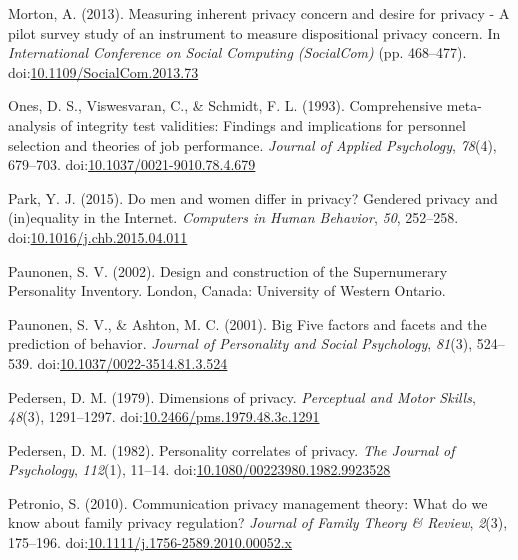 \documentclass[man,floatsintext]{apa6}
\theoremstyle{definition}
\theoremstyle{definition}
\theoremstyle{definition}
\theoremstyle{remark}
\begin{document}
\leavevmode\hypertarget{ref-Morton.2013}{}%
Morton, A. (2013). Measuring inherent privacy concern and desire for
privacy - A pilot survey study of an instrument to measure dispositional
privacy concern. In \emph{International Conference on Social Computing
(SocialCom)} (pp. 468--477).
doi:\href{https://doi.org/10.1109/SocialCom.2013.73}{10.1109/SocialCom.2013.73}

\leavevmode\hypertarget{ref-Ones.1993}{}%
Ones, D. S., Viswesvaran, C., \& Schmidt, F. L. (1993). Comprehensive
meta-analysis of integrity test validities: Findings and implications
for personnel selection and theories of job performance. \emph{Journal
of Applied Psychology}, \emph{78}(4), 679--703.
doi:\href{https://doi.org/10.1037/0021-9010.78.4.679}{10.1037/0021-9010.78.4.679}

\leavevmode\hypertarget{ref-Park.2015}{}%
Park, Y. J. (2015). Do men and women differ in privacy? Gendered privacy
and (in)equality in the Internet. \emph{Computers in Human Behavior},
\emph{50}, 252--258.
doi:\href{https://doi.org/10.1016/j.chb.2015.04.011}{10.1016/j.chb.2015.04.011}

\leavevmode\hypertarget{ref-Paunonen.2002}{}%
Paunonen, S. V. (2002). Design and construction of the Supernumerary
Personality Inventory. London, Canada: University of Western Ontario.

\leavevmode\hypertarget{ref-Paunonen.2001}{}%
Paunonen, S. V., \& Ashton, M. C. (2001). Big Five factors and facets
and the prediction of behavior. \emph{Journal of Personality and Social
Psychology}, \emph{81}(3), 524--539.
doi:\href{https://doi.org/10.1037/0022-3514.81.3.524}{10.1037/0022-3514.81.3.524}

\leavevmode\hypertarget{ref-Pedersen.1979}{}%
Pedersen, D. M. (1979). Dimensions of privacy. \emph{Perceptual and
Motor Skills}, \emph{48}(3), 1291--1297.
doi:\href{https://doi.org/10.2466/pms.1979.48.3c.1291}{10.2466/pms.1979.48.3c.1291}

\leavevmode\hypertarget{ref-Pedersen.1982}{}%
Pedersen, D. M. (1982). Personality correlates of privacy. \emph{The
Journal of Psychology}, \emph{112}(1), 11--14.
doi:\href{https://doi.org/10.1080/00223980.1982.9923528}{10.1080/00223980.1982.9923528}

\leavevmode\hypertarget{ref-Petronio.2010}{}%
Petronio, S. (2010). Communication privacy management theory: What do we
know about family privacy regulation? \emph{Journal of Family Theory \&
Review}, \emph{2}(3), 175--196.
doi:\href{https://doi.org/10.1111/j.1756-2589.2010.00052.x}{10.1111/j.1756-2589.2010.00052.x}
\end{document}
